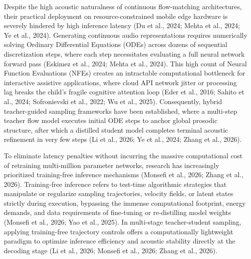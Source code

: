 \documentclass[12pt,a4paper,oneside]{report}
\begin{document}
Despite the high acoustic naturalness of continuous flow-matching architectures, their practical deployment on resource-constrained mobile edge hardware is severely hindered by high inference latency (Du et al., 2024; Mehta et al., 2024; Ye et al., 2024). Generating continuous audio representations requires numerically solving Ordinary Differential Equations (ODEs) across dozens of sequential discretization steps, where each step necessitates evaluating a full neural network forward pass (Eskimez et al., 2024; Mehta et al., 2024). This high count of Neural Function Evaluations (NFEs) creates an intractable computational bottleneck for interactive assistive applications, where cloud API network jitter or processing lag breaks the child's fragile cognitive attention loop (Eder et al., 2016; Sahito et al., 2024; Sofronievski et al., 2022; Wu et al., 2025). Consequently, hybrid teacher-guided sampling frameworks have been established, where a multi-step teacher flow model executes initial ODE steps to anchor global prosodic structure, after which a distilled student model completes terminal acoustic refinement in very few steps (Li et al., 2026; Ye et al., 2024; Zhang et al., 2026).
 
To eliminate latency penalties without incurring the massive computational cost of retraining multi-million parameter networks, research has increasingly prioritized training-free inference mechanisms (Monsefi et al., 2026; Zhang et al., 2026). Training-free inference refers to test-time algorithmic strategies that manipulate or regularize sampling trajectories, velocity fields, or latent states strictly during execution, bypassing the immense computational footprint, energy demands, and data requirements of fine-tuning or re-distilling model weights (Monsefi et al., 2026; Yao et al., 2025). In multi-stage teacher-student sampling, applying training-free trajectory controls offers a computationally lightweight paradigm to optimize inference efficiency and acoustic stability directly at the decoding stage (Li et al., 2026; Monsefi et al., 2026; Zhang et al., 2026).
\end{document}
